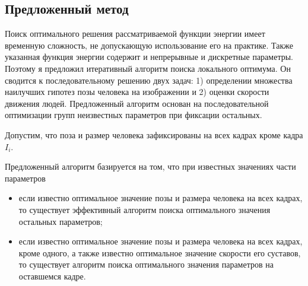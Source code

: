 \subsection{Предложенный метод}

Поиск оптимального решения рассматриваемой функции энергии имеет временную сложность, не допускающую использование его на практике. Также указанная функция энергии содержит и непрерывные и дискретные параметры. Поэтому я предложил итеративный алгоритм поиска локального оптимума. Он сводится к последовательному решению двух задач: 1) определении множества наилучших гипотез позы человека на изображении и 2) оценки скорости движения людей. Предложенный алгоритм основан на последовательной оптимизации групп неизвестных параметров при фиксации остальных.

Допустим, что поза и размер человека зафиксированы на всех кадрах кроме кадра $I_i$.

Предложенный алгоритм базируется на том, что при известных значениях части параметров
\begin{itemize}
	\item если известно оптимальное значение позы и размера человека на всех кадрах, то существует эффективный алгоритм поиска оптимального значения остальных параметров;
	\item если известно оптимальное значение позы и размера человека на всех кадрах, кроме одного, а также известно оптимальное значение скорости его суставов, то существует алгоритм поиска оптимального значения параметров на оставшемся кадре.
\end{itemize}

